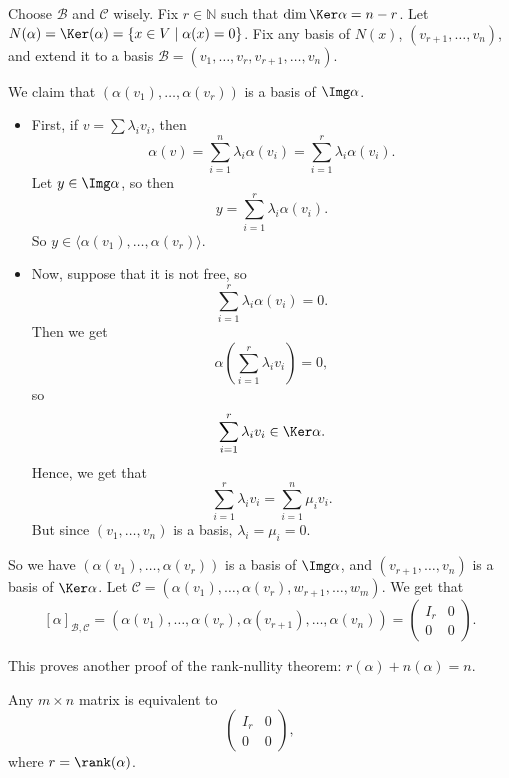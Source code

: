 \documentclass[12pt]{article}
\begin{document}
\begin{proofbox}
	Choose $\mathcal{B}$ and $\mathcal{C}$ wisely. Fix $r \in \mathbb{N}$ such that $\dim \Ker \alpha = n - r$. Let $N(\alpha) = \Ker(\alpha) = \{x \in V \mid \alpha(x) = 0\}$. Fix any basis of $N(x)$, $(v_{r+1}, \ldots, v_n)$, and extend it to a basis $\mathcal{B} = (v_1, \ldots, v_r, v_{r+1}, \ldots, v_n)$.

	We claim that $(\alpha(v_1), \ldots, \alpha(v_r))$ is a basis of $\Img \alpha$.
	\begin{itemize}
		\item First, if $v = \sum \lambda_i v_i$, then
			\[
				\alpha(v) = \sum_{i = 1}^{n} \lambda_i \alpha(v_i) = \sum_{i = 1}^{r} \lambda_i \alpha(v_i)
			.\]
			Let $y \in \Img \alpha$, so then
			\[
				y = \sum_{i = 1}^{r} \lambda_i \alpha(v_i)
			.\]
			So $y \in \langle \alpha(v_1), \ldots, \alpha(v_r)\rangle$.
		\item Now, suppose that it is not free, so
			\[
				\sum_{i = 1}^{r} \lambda_i \alpha(v_i) = 0
			.\]
			Then we get
			\[
				\alpha\left( \sum_{i = 1}^{r} \lambda_i v_i \right) = 0
			,\]
			so
			\[
			\sum_{i = 1}^{r} \lambda_i v_i \in \Ker \alpha
			.\]
			Hence, we get that
			\[
			\sum_{i = 1}^{r} \lambda_i v_i = \sum_{i = 1}^{n} \mu_i v_i
			.\]
			But since $(v_1, \ldots, v_n)$ is a basis, $\lambda_i = \mu_i = 0$.
	\end{itemize}
	So we have $(\alpha(v_1), \ldots, \alpha(v_r))$ is a basis of $\Img \alpha$, and $(v_{r+1}, \ldots, v_{n})$ is a basis of $\Ker \alpha$. Let $\mathcal{C} = (\alpha(v_1), \ldots, \alpha(v_r), w_{r+1}, \ldots, w_{m})$. We get that
	\[
		[\alpha]_{\mathcal{B}, \mathcal{C}} = (\alpha(v_1), \ldots, \alpha(v_r), \alpha(v_{r+1}), \ldots, \alpha(v_n)) =
		\begin{pmatrix}
			I_r & 0 \\
			0 & 0
		\end{pmatrix}	
	.\]
\end{proofbox}

\begin{remark}
	This proves another proof of the rank-nullity theorem: $r(\alpha) + n(\alpha) = n$.
\end{remark}

\begin{corollary}
	Any $m \times n$ matrix is equivalent to
	\[
	\begin{pmatrix}
		I_r & 0 \\
		0 & 0
	\end{pmatrix}
	,\]
	where $r = \rank(\alpha)$.
\end{corollary}
\end{document}
